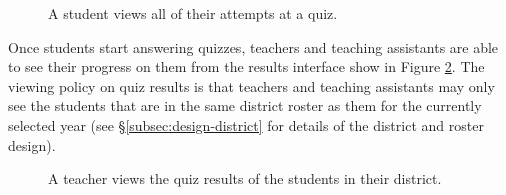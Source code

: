\begin{figure}[h!]
	\centering
	\caption{A student views all of their attempts at a quiz.}
	\label{fig:screens-quiz-attempt-list}
\end{figure}

Once students start answering quizzes, teachers and teaching assistants are able to see their progress on them from the results interface show in Figure \ref{fig:screens-quiz-results-list}. The viewing policy on quiz results is that teachers and teaching assistants may only see the students that are in the same district roster as them for the currently selected year (see \S \ref{subsec:design-district} for details of the district and roster design).

\begin{figure}[h!]
	\centering
	\caption{A teacher views the quiz results of the students in their district.}
	\label{fig:screens-quiz-results-list}
\end{figure}

